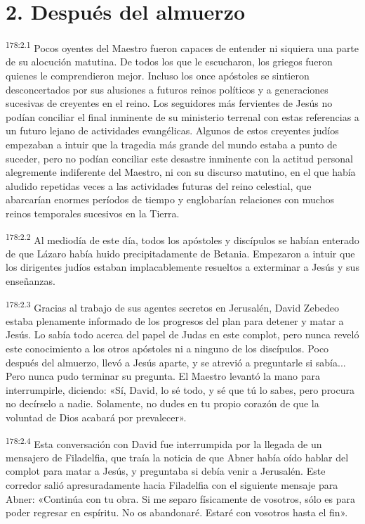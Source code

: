 \section*{2. Después del almuerzo}
\par
\textsuperscript{178:2.1} Pocos oyentes del Maestro fueron capaces de entender ni siquiera una parte de su alocución matutina. De todos los que le escucharon, los griegos fueron quienes le comprendieron mejor. Incluso los once apóstoles se sintieron desconcertados por sus alusiones a futuros reinos políticos y a generaciones sucesivas de creyentes en el reino. Los seguidores más fervientes de Jesús no podían conciliar el final inminente de su ministerio terrenal con estas referencias a un futuro lejano de actividades evangélicas. Algunos de estos creyentes judíos empezaban a intuir que la tragedia más grande del mundo estaba a punto de suceder, pero no podían conciliar este desastre inminente con la actitud personal alegremente indiferente del Maestro, ni con su discurso matutino, en el que había aludido repetidas veces a las actividades futuras del reino celestial, que abarcarían enormes períodos de tiempo y englobarían relaciones con muchos reinos temporales sucesivos en la Tierra.

\par
\textsuperscript{178:2.2} Al mediodía de este día, todos los apóstoles y discípulos se habían enterado de que Lázaro había huido precipitadamente de Betania. Empezaron a intuir que los dirigentes judíos estaban implacablemente resueltos a exterminar a Jesús y sus enseñanzas.

\par
\textsuperscript{178:2.3} Gracias al trabajo de sus agentes secretos en Jerusalén, David Zebedeo estaba plenamente informado de los progresos del plan para detener y matar a Jesús. Lo sabía todo acerca del papel de Judas en este complot, pero nunca reveló este conocimiento a los otros apóstoles ni a ninguno de los discípulos. Poco después del almuerzo, llevó a Jesús aparte, y se atrevió a preguntarle si sabía... Pero nunca pudo terminar su pregunta. El Maestro levantó la mano para interrumpirle, diciendo: «Sí, David, lo sé todo, y sé que tú lo sabes, pero procura no decírselo a nadie. Solamente, no dudes en tu propio corazón de que la voluntad de Dios acabará por prevalecer».

\par
\textsuperscript{178:2.4} Esta conversación con David fue interrumpida por la llegada de un mensajero de Filadelfia, que traía la noticia de que Abner había oído hablar del complot para matar a Jesús, y preguntaba si debía venir a Jerusalén. Este corredor salió apresuradamente hacia Filadelfia con el siguiente mensaje para Abner: «Continúa con tu obra. Si me separo físicamente de vosotros, sólo es para poder regresar en espíritu. No os abandonaré. Estaré con vosotros hasta el fin».

